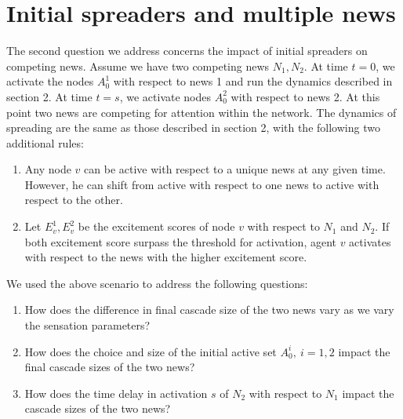 \documentclass[10pt]{article}
\begin{document}
\section{Initial spreaders and multiple news}
The second question we address concerns the impact of initial spreaders on competing news. Assume we have two competing news $N_1, N_2$. At time $t = 0$, we activate the nodes $A_0^1$ with respect to news 1 and run the dynamics described in section 2. At time $t = s$, we activate nodes $A_0^2$ with respect to news 2. At this point two news are competing for attention within the network. The dynamics of spreading are the same as those described in section 2, with the following two additional rules:
\begin{enumerate}
\item Any node $v$ can be active with respect to a unique news at any given time. However, he can shift from active with respect to one news to active with respect to the other.
\item Let $E_v^1, E_v^2$ be the excitement scores of node $v$ with respect to $N_1$ and $N_2$. If both excitement score surpass the threshold for activation, agent $v$ activates with respect to the news with the higher excitement score.
\end{enumerate}
We used the above scenario to address the following questions:
\begin{enumerate}
\item How does the difference in final cascade size of the two news vary as we vary the sensation parameters?
\item How does the choice and size of the initial active set $A_0^{i}, \ i =1,2$ impact the final cascade sizes of the two news?
\item How does the time delay in activation $s$ of $N_2$ with respect to $N_1$ impact the cascade sizes of the two news?
\end{enumerate}
\end{document}
